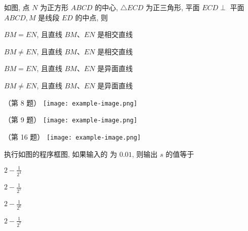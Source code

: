 \documentclass{exam-zh}
\begin{document}
\begin{question}
  如图, 点 $N$ 为正方形 $A B C D$ 的中心, $\triangle E C D$ 为正三角形, 平面 $E C D \perp$ 平面 $A B C D, M$ 是线段 $E D$ 的中点, 则 \paren
  \begin{choices}
    \item $B M = E N$, 且直线 $B M$、$E N$ 是相交直线
    \item $B M \neq E N$, 且直线 $B M$、$E N$ 是相交直线
    \item $B M = E N$, 且直线 $B M$、$E N$ 是异面直线
    \item $B M \neq E N$, 且直线 $B M$、$E N$ 是异面直线
  \end{choices}
\end{question}

\begin{multifigures}[align=m][width=0.8\textwidth,colspec={X[1]X[1]X[1]}]
  \item[（第 8 题）]  \texttt{[image: example-image.png]}
  \item[（第 9 题）] \texttt{[image: example-image.png]}
  \item[（第 16 题）] \texttt{[image: example-image.png]}
\end{multifigures}

\begin{question}
  执行如图的程序框图, 如果输入的 为 $0.01$, 则输出 $s$ 的值等于 \paren
  \begin{choices}
    \item $2 - \frac{1}{2^{4}}$
    \item $2 - \frac{1}{2^{5}}$
    \item $2 - \frac{1}{2^{6}}$
    \item $2 - \frac{1}{2^{7}}$
  \end{choices}
\end{question}
\end{document}
